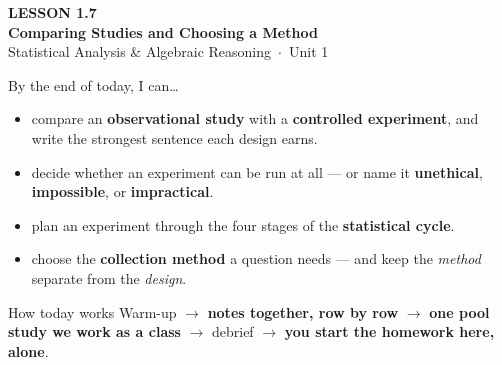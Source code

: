\documentclass[aspectratio=169, 11pt]{beamer}
\begin{document}
{
\begin{frame}[plain]
  \vspace{2.8cm}\hspace{0.55cm}%
  \begin{minipage}{0.9\textwidth}
    {\color{goldacc}\bfseries\small LESSON 1.7}\\[0.5cm]
    {\color{white}\bfseries\LARGE Comparing Studies and Choosing a Method}\\[1.2cm]
    {\color{frostmid}\small Statistical Analysis \& Algebraic Reasoning~$\cdot$~Unit 1}
  \end{minipage}
\end{frame}
}

\begin{frame}[t, plain]
  By the end of today, I can\ldots
  \begin{itemize}\setlength{\itemsep}{5pt}
    \item compare an \textbf{observational study} with a \textbf{controlled experiment}, and
          write the strongest sentence each design earns.
    \item decide whether an experiment can be run at all --- or name it \textbf{unethical},
          \textbf{impossible}, or \textbf{impractical}.
    \item plan an experiment through the four stages of the \textbf{statistical cycle}.
    \item choose the \textbf{collection method} a question needs --- and keep the \emph{method}
          separate from the \emph{design}.
  \end{itemize}
  \begin{block}{How today works}
    Warm-up $\to$ \textbf{notes together, row by row} $\to$ \textbf{one pool study we work as a
    class} $\to$ debrief $\to$ \textbf{you start the homework here, alone}.
  \end{block}
\end{frame}
\end{document}
